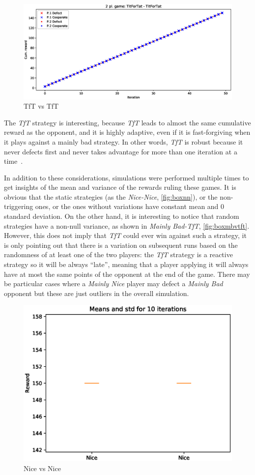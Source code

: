 \documentclass[journal,10pt,twoside]{IEEEtran}
\begin{document}
\begin{figure}[!ht]
    \centering
    \includegraphics[width=.9\columnwidth]{../img/ipd2p/ipd2p-rewards-TitForTat-TitForTat}
    \caption{TfT vs TfT}
    \label{fig:tftvstft}
\end{figure}

The \textit{TfT} strategy is interesting, because \textit{TfT} leads to almost the same cumulative reward as the opponent, and it is highly adaptive, even if it is fast-forgiving when it plays against a mainly bad strategy. In other words, \textit{TfT} is robust because it never defects first and never takes advantage for more than one iteration at a time~\cite{fogelEvolvingBehaviors}.

In addition to these considerations, simulations were performed multiple times to get insights of the mean and variance of the rewards ruling these games. It is obvious that the static strategies (as the \textit{Nice-Nice}, \autoref{fig:boxnn}), or the non-triggering ones, or the ones without variations have constant mean and 0 standard deviation. On the other hand, it is interesting to notice that random strategies have a non-null variance, as shown in \textit{Mainly Bad-TfT}, \autoref{fig:boxmbvtft}. However, this does not imply that \textit{TfT} could ever win against such a strategy, it is only pointing out that there is a variation on subsequent runs based on the randomness of at least one of the two players: the \textit{TfT} strategy is a reactive strategy so it will be always ``late'', meaning that a player applying it will always have at most the same points of the opponent at the end of the game. There may be particular cases where a \textit{Mainly Nice} player may defect a \textit{Mainly Bad} opponent but these are just outliers in the overall simulation.

\begin{figure}[!ht]
    \centering
    \includegraphics[width=.7\columnwidth]{../img/ipd2p/ipd2p-boxplot-Nice-Nice}
    \caption{Nice vs Nice}
    \label{fig:boxnn}
\end{figure}
\end{document}
